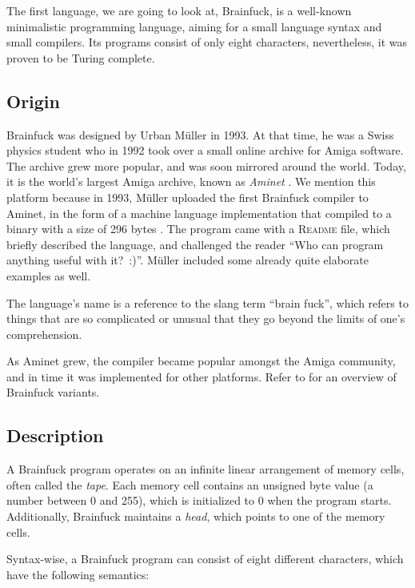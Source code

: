 The first language, we are going to look at, Brainfuck, is a well-known minimalistic programming language, aiming for a small language syntax and small compilers. Its programs consist of only eight characters, nevertheless, it was proven to be Turing complete.

\subsection{Origin}

Brainfuck was designed by Urban Müller in 1993. At that time, he was a Swiss physics student who in 1992 took over a small online archive for Amiga software. The archive grew more popular, and was soon mirrored around the world. Today, it is the world's largest Amiga archive, known as \emph{Aminet} \cite{muller1993aminet}. We mention this platform because in 1993, Müller uploaded the first Brainfuck compiler to Aminet, in the form of a machine language implementation that compiled to a binary with a size of 296 bytes \cite{muller1993240}. The program came with a \textsc{Readme} file, which briefly described the language, and challenged the reader “Who can program anything useful with it?~:)”. Müller included some already quite elaborate examples as well.

The language's name is a reference to the slang term “brain fuck”, which refers to things that are so complicated or unusual that they go beyond the limits of one's comprehension.

As Aminet grew, the compiler became popular amongst the Amiga community, and in time it was implemented for other platforms. Refer to  for an overview of Brainfuck variants.

\subsection{Description}

A Brainfuck program operates on an infinite linear arrangement of memory cells, often called the \emph{tape}. Each memory cell contains an unsigned byte value (a number between 0 and 255), which is initialized to 0 when the program starts. Additionally, Brainfuck maintains a \emph{head}, which points to one of the memory cells.

Syntax-wise, a Brainfuck program can consist of eight different characters, which have the following semantics:

